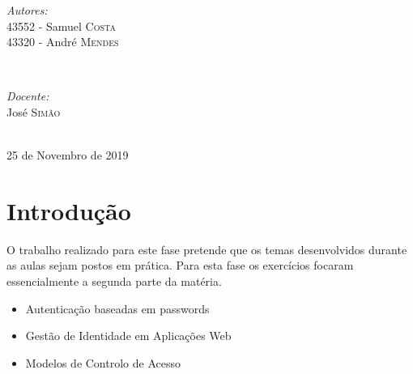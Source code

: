 \documentclass[11pt]{report}
\begin{document}
\begin{titlepage}
\vskip 70pt
\begin{minipage}{0.4\textwidth}
\begin{flushleft} \large
\emph{Autores:}\\
43552 - Samuel \textsc{Costa}\\
43320 - André \textsc{Mendes}
\end{flushleft}
\end{minipage}
~
\begin{minipage}{0.4\textwidth}
\begin{flushright} \large
\emph{Docente:} \\
José \textsc{Simão}\\
\end{flushright}
\end{minipage}\\[3cm]


{\large 25 de Novembro de 2019}\\[3cm] %


\vfill %

\end{titlepage}


\renewcommand\thesection{\arabic{section}}

\tableofcontents


\newpage


\section{Introdução}
O trabalho realizado para este fase pretende que os temas desenvolvidos durante as aulas sejam postos em prática. Para esta fase os exercícios focaram essencialmente a segunda parte da matéria.\\

\begin{itemize}
  \item Autenticação baseadas em passwords
  \item Gestão de Identidade em Aplicações Web
  \item Modelos de Controlo de Acesso
\end{itemize}
\end{document}
